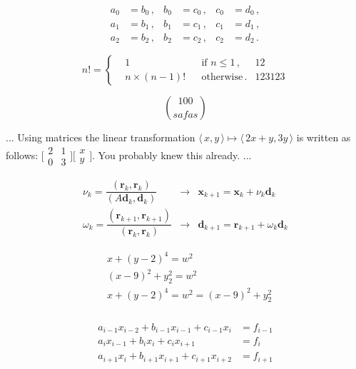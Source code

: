 \documentclass{article}
\begin{document}
\tableofcontents

\begin{align}
a_0&=b_0\,, &b_0&=c_0\,, &c_0&=d_0\,,\\ a_1&=b_1\,, &b_1&=c_1\,, &c_1&=d_1\,,\\ a_2&=b_2\,, &b_2&=c_2\,, &c_2&=d_2\,.
\end{align}

\[ n! =
 \left\{
   \begin{aligned}
      & 1               && \text{if $n \leq 1$}\,, & 12\\
      & n \times (n-1)! && \text{otherwise}\,. & 123123
   \end{aligned}
 \right. \]

\[\binom{100}{safas}\]

... Using matrices the linear transformation $\langle\,x,y\,\rangle
\mapsto
\langle\,2 x + y, 3 y\,\rangle$
is written as follows:
$\bigl[\begin{smallmatrix} 2&1 \\ 0&3 \end{smallmatrix}
\bigr]
\bigl[\begin{smallmatrix} x \\ y \end{smallmatrix}
\bigr]$.
You probably knew this already. ...


\begin{equation}
\renewcommand\arraystretch{1.5}
\begin{array}{lcl}
\nu_k=\dfrac{(\boldsymbol{r}_k,\boldsymbol{r}_k)}{(A\boldsymbol{d}_k,\boldsymbol{d}_k)} & \to &
\boldsymbol{x}_{k+1}=\boldsymbol{x}_k+\nu_k\boldsymbol{d}_k \\
\omega_k=\dfrac{(\boldsymbol{r}_{k+1},\boldsymbol{r}_{k+1})}{(\boldsymbol{r}_k,\boldsymbol{r}_k)} & \to &
\boldsymbol{d}_{k+1}=\boldsymbol{r}_{k+1}+\omega_k\boldsymbol{d}_k
\end{array}
\end{equation}

\begin{eqnarray*}
    &x + (y - 2)^4 = w^2 \\
    &(x  - 9)^2 + y_2^2 = w^2 \\
    &x + (y - 2)^4 = w^2 = (x  - 9)^2 + y_2^2 \\
\end{eqnarray*}

\begin{align}
\label{eq:trisys}
\begin{split}
a_{i-1}x_{i-2}+b_{i-1}x_{i-1}+c_{i-1}x_{i} &= f_{i-1} \\
a_ix_{i-1}+b_ix_i+c_ix_{i+1} &= f_i \\
a_{i+1}x_{i}+b_{i+1}x_{i+1}+c_{i+1}x_{i+2} &= f_{i+1}
\end{split}
\end{align}
\end{document}
